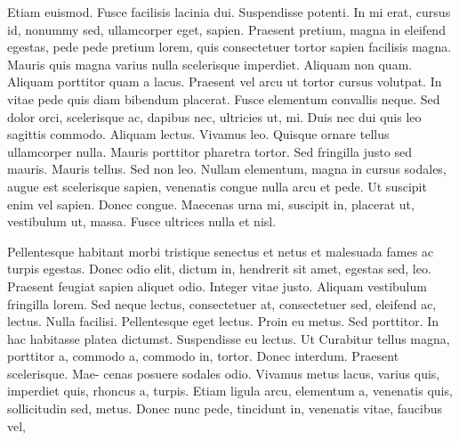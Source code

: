 \documentclass[AMS,STIX2COL]{WileyNJD-v2}
\begin{document}
    Etiam euismod. Fusce facilisis lacinia dui. Suspendisse potenti. In mi erat, cursus id, nonummy sed, ullamcorper
    eget, sapien. Praesent pretium, magna in eleifend egestas, pede pede pretium lorem, quis consectetuer tortor sapien
    facilisis magna. Mauris quis magna varius nulla scelerisque imperdiet. Aliquam non quam. Aliquam porttitor quam
    a lacus. Praesent vel arcu ut tortor cursus volutpat. In vitae pede quis diam bibendum placerat. Fusce elementum
    convallis neque. Sed dolor orci, scelerisque ac, dapibus nec, ultricies ut, mi. Duis nec dui quis leo sagittis commodo.
    Aliquam lectus. Vivamus leo. Quisque ornare tellus ullamcorper nulla. Mauris porttitor pharetra tortor. Sed fringilla
    justo sed mauris. Mauris tellus. Sed non leo. Nullam elementum, magna in cursus sodales, augue est scelerisque
    sapien, venenatis congue nulla arcu et pede. Ut suscipit enim vel sapien. Donec congue. Maecenas urna mi, suscipit
    in, placerat ut, vestibulum ut, massa. Fusce ultrices nulla et nisl.

    Pellentesque habitant morbi tristique senectus et netus et malesuada fames ac turpis egestas. Donec odio elit,
    dictum in, hendrerit sit amet, egestas sed, leo. Praesent feugiat sapien aliquet odio. Integer vitae justo. Aliquam
    vestibulum fringilla lorem. Sed neque lectus, consectetuer at, consectetuer sed, eleifend ac, lectus. Nulla facilisi.
    Pellentesque eget lectus. Proin eu metus. Sed porttitor. In hac habitasse platea dictumst. Suspendisse eu lectus. Ut Curabitur tellus magna, porttitor a, commodo a, commodo in, tortor. Donec interdum. Praesent scelerisque. Mae-
    cenas posuere sodales odio. Vivamus metus lacus, varius quis, imperdiet quis, rhoncus a, turpis. Etiam ligula arcu,
    elementum a, venenatis quis, sollicitudin sed, metus. Donec nunc pede, tincidunt in, venenatis vitae, faucibus vel,
\end{document}
